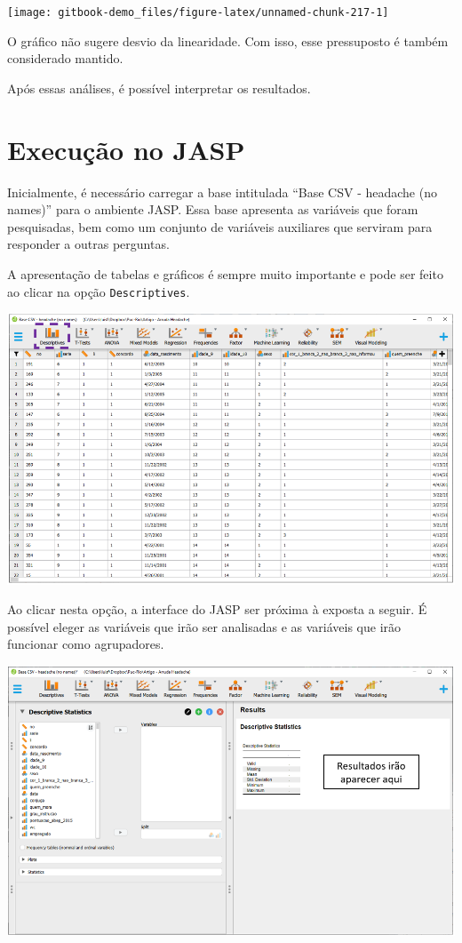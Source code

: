 \documentclass[
]{book}
\begin{document}
\begin{center}\texttt{[image: gitbook-demo\_files/figure-latex/unnamed-chunk-217-1]} \end{center}

O gráfico não sugere desvio da linearidade. Com isso, esse pressuposto é
também considerado mantido.

Após essas análises, é possível interpretar os resultados.

\hypertarget{execuuxe7uxe3o-no-jasp-16}{%
\section{Execução no JASP}\label{execuuxe7uxe3o-no-jasp-16}}

Inicialmente, é necessário carregar a base intitulada ``Base CSV -
headache (no names)'' para o ambiente JASP. Essa base apresenta as
variáveis que foram pesquisadas, bem como um conjunto de variáveis
auxiliares que serviram para responder a outras perguntas.

A apresentação de tabelas e gráficos é sempre muito importante e pode
ser feito ao clicar na opção \texttt{Descriptives}.

\includegraphics{./img/cap_logistica_base.png}

Ao clicar nesta opção, a interface do JASP ser próxima à exposta a
seguir. É possível eleger as variáveis que irão ser analisadas e as
variáveis que irão funcionar como agrupadores.

\includegraphics{./img/cap_logistica_descriptives.png}
\end{document}
